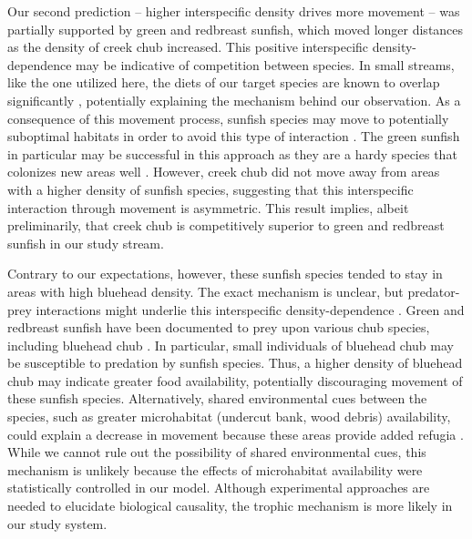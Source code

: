 \documentclass[11pt, class=article, crop=false]{standalone}
\begin{document}
Our second prediction -- higher interspecific density drives more movement -- was partially supported by green and redbreast sunfish, which moved longer distances as the density of creek chub increased. 
This positive interspecific density-dependence may be indicative of competition between species.
In small streams, like the one utilized here, the diets of our target species are known to overlap significantly \citep{collarPISCIVORYLIMITSDIVERSIFICATION2009, lemlySuppressionNativeFish1985, karrAssessmentBioticIntegrity1981, leonardApplicationTestingIndex1986}, potentially explaining the mechanism behind our observation.  
As a consequence of this movement process, sunfish species may move to potentially suboptimal habitats in order to avoid this type of interaction \citep{jacobHabitatChoiceMeets2018, thierryInterplayAbioticBiotic2024}. 
The green sunfish in particular may be successful in this approach as they are a hardy species that colonizes new areas well \citep{lemlySuppressionNativeFish1985, moyleInlandFishesCalifornia2002}.
However, creek chub did not move away from areas with a higher density of sunfish species, suggesting that this interspecific interaction through movement is asymmetric.
This result implies, albeit preliminarily, that creek chub is competitively superior to green and redbreast sunfish in our study stream.

Contrary to our expectations, however, these sunfish species tended to stay in areas with high bluehead density.
The exact mechanism is unclear, but predator-prey interactions might underlie this interspecific density-dependence \citep{jacobHabitatMatchingSpatial2015}. Green and redbreast sunfish have been documented to prey upon various chub species, including bluehead chub \citep{lemlySuppressionNativeFish1985, borrelliPuttingLakeTogether2023}.
In particular, small individuals of bluehead chub may be susceptible to predation by sunfish species. 
Thus, a higher density of bluehead chub may indicate greater food availability, potentially discouraging movement of these sunfish species.
Alternatively, shared environmental cues between the species, such as greater microhabitat (undercut bank, wood debris) availability, could explain a decrease in movement because these areas provide added refugia \citep{careyEffectsLittoralHabitat2010}.
While we cannot rule out the possibility of shared environmental cues, this mechanism is unlikely because the effects of microhabitat availability were statistically controlled in our model. Although experimental approaches are needed to elucidate biological causality, the trophic mechanism is more likely in our study system. 
\end{document}
